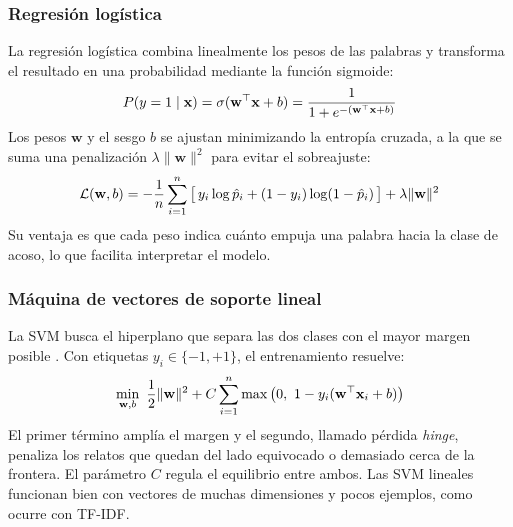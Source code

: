 \subsubsection{Regresión logística}
La regresión logística combina linealmente los pesos de las palabras y transforma el resultado en una probabilidad mediante la función sigmoide:
\begin{equation}
\ecuacion{Regresión logística}
P(y = 1 \mid \mathbf{x}) = \sigma(\mathbf{w}^{\top}\mathbf{x} + b) = \frac{1}{1 + e^{-(\mathbf{w}^{\top}\mathbf{x} + b)}}
\label{eq:logistica}
\end{equation}
Los pesos $\mathbf{w}$ y el sesgo $b$ se ajustan minimizando la entropía cruzada, a la que se suma una penalización $\lambda \lVert \mathbf{w} \rVert^{2}$ para evitar el sobreajuste:
\begin{equation}
\ecuacion{Función de pérdida de la regresión logística}
\mathcal{L}(\mathbf{w}, b) = -\frac{1}{n}\sum_{i=1}^{n}\big[\,y_i \log \hat{p}_i + (1 - y_i)\log(1 - \hat{p}_i)\,\big] + \lambda \lVert \mathbf{w} \rVert^{2}
\label{eq:logloss}
\end{equation}
Su ventaja es que cada peso indica cuánto empuja una palabra hacia la clase de acoso, lo que facilita interpretar el modelo.

\subsubsection{Máquina de vectores de soporte lineal}
La SVM busca el hiperplano que separa las dos clases con el mayor margen posible \citep{cortes1995}. Con etiquetas $y_i \in \{-1, +1\}$, el entrenamiento resuelve:
\begin{equation}
\ecuacion{Problema de optimización de la SVM lineal}
\min_{\mathbf{w}, b}\ \frac{1}{2}\lVert \mathbf{w} \rVert^{2} + C \sum_{i=1}^{n} \max\big(0,\ 1 - y_i(\mathbf{w}^{\top}\mathbf{x}_i + b)\big)
\label{eq:svm}
\end{equation}
El primer término amplía el margen y el segundo, llamado pérdida \textit{hinge}, penaliza los relatos que quedan del lado equivocado o demasiado cerca de la frontera. El parámetro $C$ regula el equilibrio entre ambos. Las SVM lineales funcionan bien con vectores de muchas dimensiones y pocos ejemplos, como ocurre con TF-IDF.

